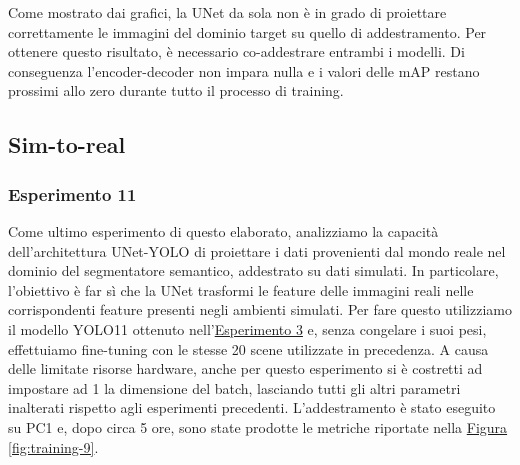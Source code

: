 \documentclass[12pt]{report}
\begin{document}
Come mostrato dai grafici, la UNet da sola non è in grado di proiettare correttamente le immagini del dominio target su quello di addestramento. Per ottenere questo risultato, è necessario co-addestrare entrambi i modelli. Di conseguenza l'encoder-decoder non impara nulla e i valori delle mAP restano prossimi allo zero durante tutto il processo di training.

\subsection{Sim-to-real}
\label{sec:sim_to_real_fr}

\subsubsection{Esperimento 11}
\label{sec:esperimento_11}

Come ultimo esperimento di questo elaborato, analizziamo la capacità dell'architettura UNet-YOLO di proiettare i dati provenienti dal mondo reale nel dominio del segmentatore semantico, addestrato su dati simulati. In particolare, l'obiettivo è far sì che la UNet trasformi le feature delle immagini reali nelle corrispondenti feature presenti negli ambienti simulati. Per fare questo utilizziamo il modello YOLO11 ottenuto nell'\hyperref[sec:esperimento_3]{Esperimento 3} e, senza congelare i suoi pesi, effettuiamo fine-tuning con le stesse 20 scene utilizzate in precedenza. A causa delle limitate risorse hardware, anche per questo esperimento si è costretti ad impostare ad 1 la dimensione del batch, lasciando tutti gli altri parametri inalterati rispetto agli esperimenti precedenti. L'addestramento è stato eseguito su PC1 e, dopo circa 5 ore, sono state prodotte le metriche riportate nella \hyperref[fig:training-9]{Figura \ref{fig:training-9}}.
\end{document}
